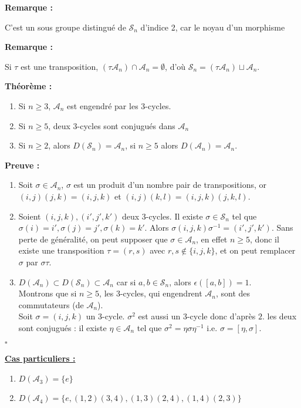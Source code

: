 \documentclass{report}
\renewenvironment{leftbar}{%
  \def\FrameCommand{\vrule width 0.4pt \hspace{10pt}}%
  \MakeFramed {\advance\hsize-\width \FrameRestore}}%
 {\endMakeFramed}%
\newenvironment{preuve}{\vspace*{0.5cm}
    \begin{leftbar}
    \noindent\textbf{Preuve :}\par}{
    \begin{flushright}
    $\square$
    \end{flushright}
    \end{leftbar}
}
\newenvironment{theoreme}[1][]{
    \begin{tcolorbox}[]
    \textbf{Théorème :} #1  \par} 
    {\end{tcolorbox}}
\newcommand{\remarque}{
    \noindent\textbf{Remarque :} \par
}
\newcommand{\sn}{\mathcal{S}_{n}}
\newcommand{\an}{\mathcal{A}_{n}}
\begin{document}
\remarque{C'est un sous groupe distingué de $\sn$ d'indice 2, car le noyau d'un morphisme}


\remarque{Si $\tau$ est une transposition, $(\tau\an)\cap\an=\emptyset$, d'où $\sn=(\tau\an)\sqcup\an$.}
\begin{theoreme}
\begin{enumerate}
\item Si $n\geq3$, $\an$ est engendré par les 3-cycles.
\item Si $n\geq5$, deux 3-cycles sont conjugués dans $\an$ 
\item Si $n\geq2$, alors $D(\sn)=\an$, si $n\geq5$ alors $D(\an)=\an$.
\end{enumerate}
\end{theoreme}

\begin{preuve}
\begin{enumerate}
\item Soit $\sigma\in\an$, $\sigma$ est un produit d'un nombre pair de transpositions, or $(i,j)(j,k)=(i,j,k)$ et $(i,j)(k,l)=(i,j,k)(j,k,l)$.
\item Soient $(i,j,k),(i',j',k')$ deux 3-cycles. Il existe $\sigma\in\sn$ tel que $\sigma(i)=i', \sigma(j)=j', \sigma(k)=k'$. Alors $\sigma(i,j,k)\sigma^{-1}=(i',j',k')$. 
Sans perte de généralité, on peut supposer que $\sigma\in\an$, en effet $n\geq5$, donc il existe une transposition $\tau=(r,s)$ avec $r,s\notin\{i,j,k\}$, et on peut remplacer $\sigma$ par $\sigma\tau$.
\item $D(\an)\subset D(\sn)\subset\an$ car si $a,b\in\sn$, alors $\epsilon([a,b])=1$.\\
Montrons que si $n\geq5$, les 3-cycles, qui engendrent $\an$, sont des commutateurs (de $\an$).\\
Soit $\sigma=(i,j,k)$ un 3-cycle. $\sigma^2$ est aussi un 3-cycle donc d'après $2.$ les deux sont conjugués : il existe $\eta\in\an$ tel que $\sigma^2=\eta\sigma\eta^{-1}$ i.e. $\sigma=[\eta,\sigma]$.
\end{enumerate}
\end{preuve}

\noindent\underline{\textbf{Cas particuliers :}}
\begin{enumerate}
\item $D(\mathcal{A}_3)=\{e\}$
\item $D(\mathcal{A}_4)=\{e,(1,2)(3,4),(1,3)(2,4),(1,4)(2,3)\}$
\end{enumerate}
\end{document}
